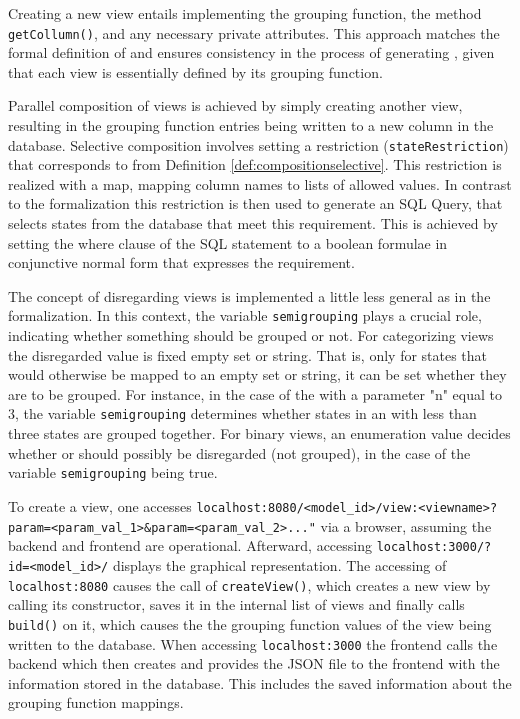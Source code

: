 \documentclass[preview]{standalone}
\begin{document}
Creating a new view entails implementing the grouping function, the method \texttt{getCollumn()}, and any necessary private attributes. This approach matches the formal definition of \viewsN and ensures consistency in the process of generating \viewsN, given that each view is essentially defined by its grouping function.

Parallel composition of views is achieved by simply creating another view, resulting in the grouping function entries being written to a new column in the database. Selective composition involves setting a  restriction (\texttt{stateRestriction}) that corresponds to \compselectset from Definition \ref{def:compositionselective}. This restriction is realized with a map, mapping column names to lists of allowed values. In contrast to the formalization this restriction is then used to generate an SQL Query, that selects states from the database that meet this requirement. This is achieved by setting the where clause of the SQL statement to a boolean formulae in conjunctive normal form that expresses the requirement.

The concept of disregarding views is implemented a little less general as in the formalization. In this context, the variable  \texttt{semigrouping} plays a crucial role, indicating whether something should be grouped or not. For categorizing views the disregarded value is fixed empty set or string. That is, only for states that would otherwise be mapped to an empty set or string, it can be set whether they are to be grouped. For instance, in the case of the \viewN \viewscc with a parameter "n" equal to 3, the variable  \texttt{semigrouping} determines whether states in an \sccN with less than three states are grouped together. For binary views, an enumeration value decides whether \hasppty or \notppty should possibly be disregarded (not grouped), in the case of the variable  \texttt{semigrouping} being true.

To create a view, one accesses \nolinkurl{localhost:8080/<model\_id>/view:<viewname>?param=<param\_val\_1>\&param=<param\_val\_2>..."} via a browser, assuming the backend and frontend are operational. Afterward, accessing \nolinkurl{localhost:3000/?id=<model\_id>/} displays the graphical \viewN representation. The accessing of \nolinkurl{localhost:8080} causes the call of \texttt{createView()}, which creates a new view by calling its constructor, saves it in the internal list of views and finally calls \texttt{build()} on it, which causes the the grouping function values of the view being written to the database. When accessing \nolinkurl{localhost:3000} the frontend calls the backend which then creates and provides the JSON file to the frontend with the information stored in the database. This includes the saved information about the grouping function mappings.
\end{document}
